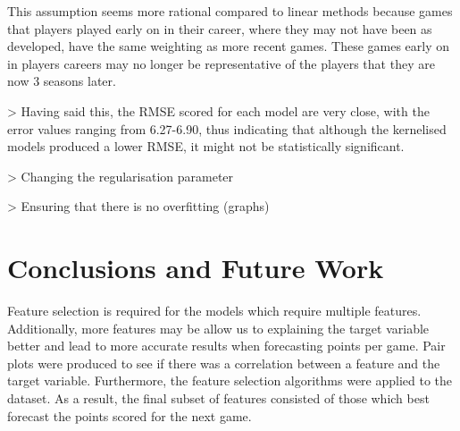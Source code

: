 \documentclass[a4paper,11pt,twoside]{article}
\begin{document}
This assumption seems more rational compared to linear methods because games that players played early on in their career, where they may not have been as developed, have the same weighting as more recent games. These games early on in players careers may no longer be representative of the players that they are now 3 seasons later.

> Having said this, the RMSE scored for each model are very close, with the error values ranging from 6.27-6.90, thus indicating that although the kernelised models produced a lower RMSE, it might not be statistically significant.

> Changing the regularisation parameter

> Ensuring that there is no overfitting (graphs)

\newpage
\section{Conclusions and Future Work}

Feature selection is required for the models which  require multiple features. Additionally, more features may be allow us to explaining the target variable better and lead to more accurate results when forecasting points per game. Pair plots were produced to see if there was a correlation between a feature and the target variable. Furthermore, the feature selection algorithms were applied to the dataset. As a result, the final subset of features consisted of those which best forecast the points scored for the next game. 
\end{document}
